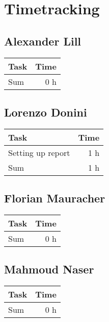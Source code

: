 \chapter{Timetracking}\label{chapter:timetracking}
\section*{Alexander Lill}
\begin{table}[h!tpb]
  \centering
  \begin{tabularx}{\textwidth}{X r}
    \toprule
      Task & Time \\
    \midrule    
    \midrule
      Sum & 0 h \\    
    \bottomrule
  \end{tabularx}
\end{table}

\clearpage
\section*{Lorenzo Donini}
\begin{table}[h!tpb]
  \centering
  \begin{tabularx}{\textwidth}{X r}
    \toprule
      Task & Time \\
    \midrule
	    Setting up report & 1 h \\
    \midrule
      Sum & 1 h \\
    \bottomrule
  \end{tabularx}
\end{table}

\clearpage
\section*{Florian Mauracher}
\begin{table}[h!tpb]
  \centering
  \begin{tabularx}{\textwidth}{X r}
    \toprule
      Task & Time \\
    \midrule
    \midrule
      Sum & 0 h \\
    \bottomrule
  \end{tabularx}
\end{table}

\clearpage
\section*{Mahmoud Naser}
\begin{table}[h!tpb]
  \centering
  \begin{tabularx}{\textwidth}{X r}
    \toprule
      Task & Time \\
    \midrule
    \midrule
      Sum & 0 h \\
    \bottomrule
  \end{tabularx}
\end{table}
